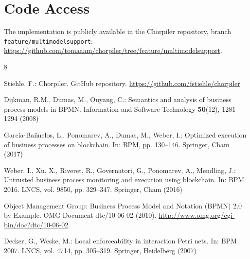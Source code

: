 \documentclass[runningheads]{llncs}
\begin{document}

\section*{Code Access}
The implementation is publicly available in the Chorpiler repository, branch
\texttt{feature/multimodelsupport}:
\url{https://github.com/tomaaam/chorpiler/tree/feature/multimodelsupport}.

\begin{thebibliography}{8}

Stiehle, F.: Chorpiler. GitHub repository.
\url{https://github.com/fstiehle/chorpiler}

Dijkman, R.M., Dumas, M., Ouyang, C.: Semantics and analysis of business process models in BPMN. Information and Software Technology \textbf{50}(12), 1281--1294 (2008)

García-Bañuelos, L., Ponomarev, A., Dumas, M., Weber, I.: Optimized execution of business processes on blockchain. In: BPM, pp. 130--146. Springer, Cham (2017)

Weber, I., Xu, X., Riveret, R., Governatori, G., Ponomarev, A., Mendling, J.:
Untrusted business process monitoring and execution using blockchain. In: BPM
2016. LNCS, vol. 9850, pp. 329--347. Springer, Cham (2016)

Object Management Group: Business Process Model and Notation (BPMN) 2.0 by
Example. OMG Document dtc/10-06-02 (2010).
\url{http://www.omg.org/cgi-bin/doc?dtc/10-06-02}

Decker, G., Weske, M.: Local enforceability in interaction Petri nets. In: BPM 2007. LNCS, vol. 4714, pp. 305--319. Springer, Heidelberg (2007)
\end{thebibliography}
\end{document}
